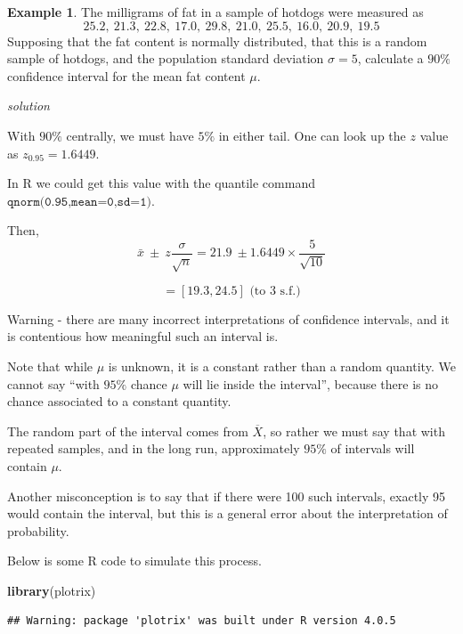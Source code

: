 \documentclass[
]{book}
\newenvironment{Shaded}{\begin{snugshade}}{\end{snugshade}}
\newcommand{\KeywordTok}[1]{\textcolor[rgb]{0.13,0.29,0.53}{\textbf{#1}}}
\newcommand{\NormalTok}[1]{#1}
\theoremstyle{definition}
\theoremstyle{definition}
\newtheorem{example}{Example}[chapter]
\theoremstyle{definition}
\theoremstyle{definition}
\theoremstyle{remark}
\begin{document}
\begin{example}
The milligrams of fat in a sample of hotdogs were measured as
\[25.2, \ 21.3,\ 22.8,\ 17.0,\ 29.8,\ 21.0,\ 25.5,\ 16.0,\ 20.9, \ 19.5\]
Supposing that the fat content is normally distributed, that this is a random sample of hotdogs, and the population standard deviation \(\sigma = 5\), calculate a \(90\%\) confidence interval for the mean fat content \(\mu\).
\end{example}

\emph{solution}

With \(90\%\) centrally, we must have \(5\%\) in either tail. One can look up the \(z\) value as \(z_{0.95}= 1.6449\).

In R we could get this value with the quantile command \(\texttt{qnorm(0.95,mean=0,sd=1)}\).

Then,
\[\bar{x} \ \pm \ z\frac{\sigma}{\sqrt{n}} = 21.9 \ \pm 1.6449\times\frac{5}{\sqrt{10}}\]

\[=[19.3 , 24.5] \text{   (to 3 s.f.)}\]

Warning - there are many incorrect interpretations of confidence intervals, and it is contentious how meaningful such an interval is.

Note that while \(\mu\) is unknown, it is a constant rather than a random quantity. We cannot say ``with \(95\%\) chance \(\mu\) will lie inside the interval'', because there is no chance associated to a constant quantity.

The random part of the interval comes from \(\overline{X}\), so rather we must say that with repeated samples, and in the long run, approximately \(95\%\) of intervals will contain \(\mu\).

Another misconception is to say that if there were 100 such intervals, exactly 95 would contain the interval, but this is a general error about the interpretation of probability.

Below is some R code to simulate this process.

\begin{Shaded}
\begin{Highlighting}[]
\KeywordTok{library}\NormalTok{(plotrix)}
\end{Highlighting}
\end{Shaded}

\begin{verbatim}
## Warning: package 'plotrix' was built under R version 4.0.5
\end{verbatim}
\end{document}

